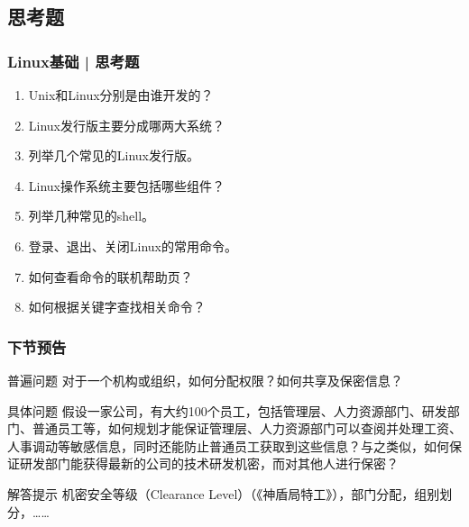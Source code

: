 \subsection{思考题}
\begin{frame}
  \frametitle{Linux基础 | 思考题}
  \begin{enumerate}
    \item Unix和Linux分别是由谁开发的？
    \item Linux发行版主要分成哪两大系统？
    \item 列举几个常见的Linux发行版。
    \item Linux操作系统主要包括哪些组件？
    \item 列举几种常见的shell。
    \item 登录、退出、关闭Linux的常用命令。
    \item 如何查看命令的联机帮助页？
    \item 如何根据关键字查找相关命令？
  \end{enumerate}
\end{frame}

\begin{frame}
  \frametitle{下节预告}
  \begin{block}{普遍问题}
    对于一个机构或组织，如何分配权限？如何共享及保密信息？
  \end{block}
  \pause
  \begin{block}{具体问题}
    假设一家公司，有大约100个员工，包括管理层、人力资源部门、研发部门、普通员工等，如何规划才能保证管理层、人力资源部门可以查阅并处理工资、人事调动等敏感信息，同时还能防止普通员工获取到这些信息？与之类似，如何保证研发部门能获得最新的公司的技术研发机密，而对其他人进行保密？
  \end{block}
  \pause
  \begin{block}{解答提示}
    机密安全等级（Clearance Level）（《神盾局特工》），部门分配，组别划分，……
  \end{block}
\end{frame}




